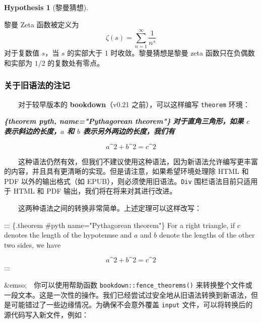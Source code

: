 \documentclass[
  12pt,
]{krantz}
\newenvironment{Shaded}{\begin{snugshade}}{\end{snugshade}}
\newcommand{\InformationTok}[1]{\textcolor[rgb]{0.56,0.35,0.01}{\textbf{\textit{#1}}}}
\newcommand{\NormalTok}[1]{#1}
\theoremstyle{definition}
\theoremstyle{definition}
\theoremstyle{definition}
\theoremstyle{definition}
\newtheorem{hypothesis}{Hypothesis}[chapter]
\theoremstyle{remark}
\begin{document}
\begin{hypothesis}[黎曼猜想]
\protect\hypertarget{hyp:unlabeled-div-9}{}\label{hyp:unlabeled-div-9}

黎曼 Zeta 函数被定义为
\[\zeta(s) = \sum_{n=1}^{\infty} \frac{1}{n^s}\]
对于复数值 \(s\)，当 \(s\) 的实部大于 1 时收敛。黎曼猜想是黎曼 zeta 函数只在负偶数和实部为 \(1/2\) 的复数处有零点。

\end{hypothesis}

\hypertarget{theorem-engine}{%
\subsubsection{关于旧语法的注记}\label{theorem-engine}}

  对于较早版本的 \textbf{bookdown}（v0.21 之前），可以这样编写 \texttt{theorem} 环境：

\begin{Shaded}
\begin{Highlighting}[]
\InformationTok{\textasciigrave{}\textasciigrave{}\textasciigrave{}\{theorem pyth, name="Pythagorean theorem"\}}
\InformationTok{对于直角三角形，如果 $c$ 表示斜边的长度，$a$ 和 $b$ 表示另外两边的长度，我们有}

\InformationTok{$$a\^{}2 + b\^{}2 = c\^{}2$$}
\InformationTok{\textasciigrave{}\textasciigrave{}\textasciigrave{}}
\end{Highlighting}
\end{Shaded}

  这种语法仍然有效，但我们不建议使用这种语法，因为新语法允许编写更丰富的内容，并且具有更清晰的实现。但是请注意，如果希望环境处理除 HTML 和 PDF 以外的输出格式（如 EPUB），则必须使用旧语法。\texttt{Div} 围栏语法目前只适用于 HTML 和 PDF 输出，我们将在将来对其进行改进。

  这两种语法之间的转换非常简单。上述定理可以这样改写：

\begin{Shaded}
\begin{Highlighting}[]
\NormalTok{::: \{.theorem \#pyth name="Pythagorean theorem"\}}
\NormalTok{For a right triangle, if $c$ denotes the length of the hypotenuse}
\NormalTok{and $a$ and $b$ denote the lengths of the other two sides, we have}

\NormalTok{$$a\^{}2 + b\^{}2 = c\^{}2$$}
\NormalTok{:::}
\end{Highlighting}
\end{Shaded}

\&emso; 你可以使用帮助函数 \texttt{bookdown::fence\_theorems()} 来转换整个文件或一段文本。这是一次性的操作。我们已经尝试过安全地从旧语法转换到新语法，但是可能错过了一些边缘情况。为确保不会意外覆盖 \texttt{input} 文件，可以将转换后的源代码写入新文件，例如：
\end{document}
